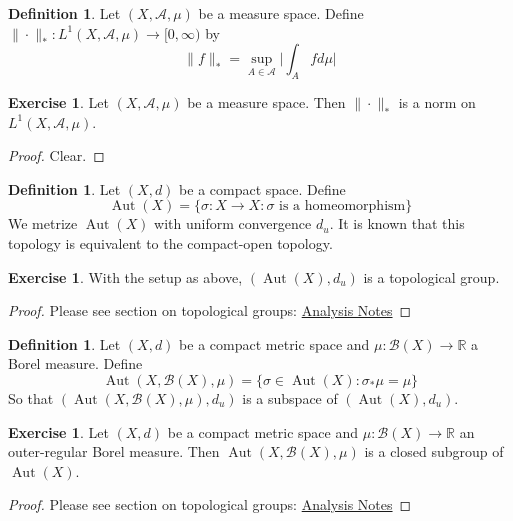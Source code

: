 \documentclass[12pt]{amsart}
\theoremstyle{definition}
\newtheorem{defn}[definition]{Definition}
\newtheorem{ex}[definition]{Exercise}
\newcommand{\sig}{\sigma}
\newcommand{\R}{\mathbb{R}}
\newcommand{\MA}{\mathcal{A}}
\newcommand{\MB}{\mathcal{B}}
\newcommand{\Rg}{[0,\infty)}
\DeclareMathOperator{\Aut}{Aut}
\begin{document}
	\begin{defn}
	Let $(X, \MA, \mu)$ be a measure space. Define $\| \cdot \|_*: L^1(X, \MA, \mu) \rightarrow \Rg$ by  
	 $$\| f \|_* = \sup_{A \in \MA} \bigg | \int_A f d\mu \bigg |$$ 
	\end{defn}
	
	\begin{ex}
	Let $(X, \MA, \mu)$ be a measure space. Then $\| \cdot \|_*$ is a norm on $L^1(X, \MA, \mu)$.
	\end{ex}
	
	\begin{proof}
	Clear.
	\end{proof}
	
	\begin{defn}
	Let $(X, d)$ be a compact space. Define $$\Aut(X) = \{\sig:X\rightarrow X: \sig \text{ is a homeomorphism} \}$$ We metrize $\Aut(X)$ with uniform convergence $d_u$. It is known that this topology is equivalent to the compact-open topology.
	\end{defn}
	
	\begin{ex}
	With the setup as above, $(\Aut(X), d_{u} )$ is a topological group.
	\end{ex}
	
	\begin{proof}
	Please see section on topological groups: \href{https://github.com/carsonaj/Mathematics/blob/master/Introduction\%20to\%20Analysis/Introduction\%20to\%20Analysis.pdf}{Analysis Notes}
	\end{proof}
	
	\begin{defn}
	Let $(X,d)$ be a compact metric space and $\mu: \MB(X) \rightarrow \R$ a Borel measure. Define $$\Aut(X, \MB(X), \mu) = \{\sig \in \Aut(X): \sig_* \mu = \mu\}$$ 
	So that $(\Aut(X, \MB(X), \mu), d_{u} )$ is a subspace of $(\Aut(X), d_{u})$.
	\end{defn}
	
	\begin{ex}
	Let $(X,d)$ be a compact metric space and $\mu: \MB(X) \rightarrow \R$ an outer-regular Borel measure. Then $\Aut(X, \MB(X), \mu)$ is a closed subgroup of $\Aut(X)$.
	\end{ex}
	
	\begin{proof}
	Please see section on topological groups: \href{https://github.com/carsonaj/Mathematics/blob/master/Introduction\%20to\%20Analysis/Introduction\%20to\%20Analysis.pdf}{Analysis Notes}
	\end{proof}
	
\end{document}
